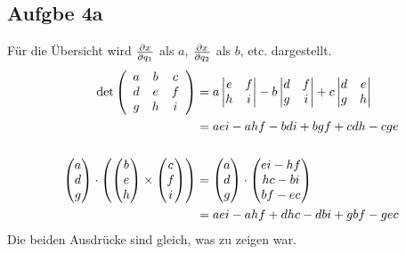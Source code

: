 \documentclass[a4paper,10pt]{extarticle}
\begin{document}
  \subsection*{Aufgbe 4a}
  Für die Übersicht wird $\pdv{x}{q_1}$ als $a$, $\pdv{x}{q_2}$ als $b$, etc. dargestellt.
  \begin{align*}
  \det \left(\begin{array}{c c c}
    a & b & c \\
    d & e & f \\
    g & h & i \\
  \end{array}\right) &= a \begin{vmatrix} e & f \\ h & i \end{vmatrix} - b \begin{vmatrix} d & f \\ g & i \end{vmatrix} + c \begin{vmatrix} d & e \\ g & h\end{vmatrix} \\
  &= aei - ahf - bdi + bgf + cdh - cge \\ \\
  \begin{pmatrix} a \\ d \\ g \end{pmatrix} \cdot \begin{pmatrix} \begin{pmatrix} b \\ e \\ h \end{pmatrix} \times \begin{pmatrix} c \\ f \\ i \end{pmatrix} \end{pmatrix} &= \begin{pmatrix} a \\ d \\ g \end{pmatrix} \cdot \begin{pmatrix} ei - hf \\ hc - bi \\ bf - ec \end{pmatrix} \\
  &= aei - ahf + dhc - dbi + gbf - gec
  \end{align*}
  Die beiden Ausdrücke sind gleich, was zu zeigen war.
\end{document}
